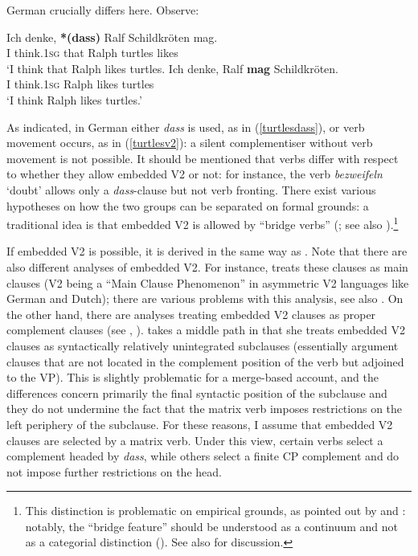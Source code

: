 German crucially differs here. Observe:\largerpage

\ea
\ea \gll Ich denke, \textbf{*(dass)} Ralf Schildkröten mag. \label{turtlesdass}\\
I think.\textsc{1sg} \phantom{\textbf{*(}}that Ralph turtles likes\\
\glt `I think that Ralph likes turtles.
\ex \gll Ich denke, Ralf \textbf{mag} Schildkröten. \label{turtlesv2}\\
I think.\textsc{1sg} Ralph likes turtles\\
\glt `I think Ralph likes turtles.'
\z
\z

As indicated, in German either \textit{dass} is used, as in (\ref{turtlesdass}), or verb movement occurs, as in (\ref{turtlesv2}): a silent complementiser without verb movement is not possible. It should be mentioned that verbs differ with respect to whether they allow embedded V2 or not: for instance, the verb \textit{bezweifeln} `doubt' allows only a \textit{dass}-clause but not verb fronting. There exist various hypotheses on how the two groups can be separated on formal grounds: a traditional idea is that embedded V2 is allowed by ``bridge verbs'' (\citealt{vikner1995}; see also \citealt{green1976}).\footnote{This distinction is problematic on empirical grounds, as pointed out by \citet{featherston2004} and \citet{meklenborgsalvesenwalkden2017}: notably, the ``bridge feature'' should be understood as a continuum and not as a categorial distinction (\citealt[205]{featherston2004}). See also \citet{hooperthompson1973} for discussion.}

If embedded V2 is possible, it is derived in the same way as . Note that there are also different analyses of embedded V2. For instance, \citet{denbesten1983} treats these clauses as main clauses (V2 being a ``Main Clause Phenomenon'' in asymmetric V2 languages like German and Dutch); there are various problems with this analysis, see also \citet{heycock2006}. On the other hand, there are analyses treating embedded V2 clauses as proper complement clauses (see \citealt{weerman1989}, \citealt{hooperthompson1973}). \citet{reis1997} takes a middle path in that she treats embedded V2 clauses as syntactically relatively unintegrated subclauses (essentially argument clauses that are not located in the complement position of the verb but adjoined to the VP). This is slightly problematic for a merge-based account, and the differences concern primarily the final syntactic position of the subclause and they do not undermine the fact that the matrix verb imposes restrictions on the left periphery of the subclause. For these reasons, I assume that embedded V2 clauses are selected by a matrix verb. Under this view, certain verbs select a complement headed by \textit{dass}, while others select a finite CP complement and do not impose further restrictions on the head. 

